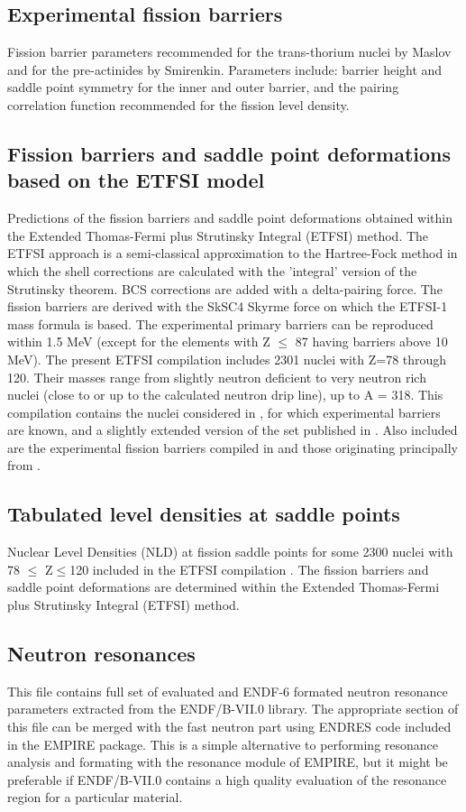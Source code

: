 \documentclass[twocolumn,amsmath,amssymb,10pt,groupedaddress,a4paper]{revtex4}
\begin{document}
\subsection{Experimental fission barriers}
Fission barrier parameters recommended for the trans-thorium nuclei
by Maslov and for the pre-actinides by Smirenkin. Parameters include:
barrier height and  saddle point symmetry for the inner and outer barrier,
and the pairing correlation function recommended for the fission level density.


\subsection{Fission barriers and saddle point deformations based on the ETFSI model}
Predictions of the fission barriers and saddle point deformations
obtained within the Extended Thomas-Fermi plus Strutinsky Integral
(ETFSI) method. The ETFSI approach is a semi-classical approximation
to the Hartree-Fock method in which the shell corrections are calculated
with the 'integral' version of the Strutinsky theorem. BCS corrections
are added with a delta-pairing force. The fission barriers are derived
with the SkSC4 Skyrme force on which the ETFSI-1 mass formula is based.
The experimental primary barriers can be reproduced within 1.5 MeV
(except for the elements with Z $\le$ 87 having barriers above 10 MeV).
The present ETFSI compilation includes 2301 nuclei with Z=78 through
120. Their masses range from slightly neutron deficient to very neutron
rich nuclei (close to or up to the calculated neutron drip line),
up to A = 318. This compilation contains the nuclei considered in
\cite{Mamdouh1998}, for which experimental barriers are known, and
a slightly extended version of the set published in \cite{Mamdouh(2001)}.
Also included are the experimental fission barriers compiled in \cite{Mamdouh1998}
and those originating principally from \cite{Smirenkin1993}.


\subsection{Tabulated level densities at saddle points}
Nuclear Level Densities (NLD) at fission saddle points for some 2300
nuclei with 78 $\le$ Z$\le$120 included in the ETFSI compilation
\cite{Mamdouh(2001)}. The fission barriers and saddle point deformations
are determined within the Extended Thomas-Fermi plus Strutinsky Integral
(ETFSI) method.

\subsection{Neutron resonances}
This file contains full set of evaluated and ENDF-6 formated
neutron resonance parameters extracted from the ENDF/B-VII.0 library.
The appropriate section of this file can be merged with the fast
neutron part using ENDRES code included in the EMPIRE package. This is a
simple alternative to performing resonance analysis and formating with the
resonance module of EMPIRE, but it might be preferable if ENDF/B-VII.0
contains a high quality evaluation of the resonance region for a particular
material.
\end{document}
